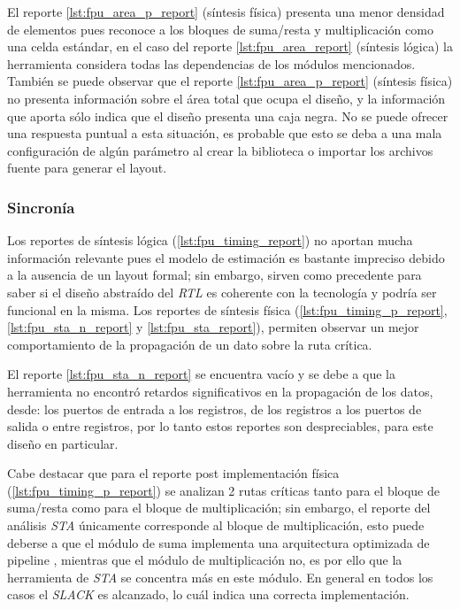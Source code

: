 El reporte \ref{lst:fpu_area_p_report} (síntesis física) presenta una menor densidad de elementos pues reconoce a los bloques de suma/resta y multiplicación como una celda estándar, en el caso del reporte \ref{lst:fpu_area_report} (síntesis lógica) la herramienta considera todas las dependencias de los módulos mencionados. También se puede observar que el reporte \ref{lst:fpu_area_p_report} (síntesis física) no presenta información sobre el área total que ocupa el diseño, y la información que aporta sólo indica que el diseño presenta una caja negra. No se puede ofrecer una respuesta puntual a esta situación, es probable que esto se deba a una mala configuración de algún parámetro al crear la biblioteca o importar los archivos fuente para generar el layout.

\subsubsection{Sincronía}

Los reportes de síntesis lógica (\ref{lst:fpu_timing_report}) no aportan mucha información relevante pues el modelo de estimación es bastante impreciso debido a la ausencia de un layout formal; sin embargo, sirven como precedente para saber si el diseño abstraído del \textit{RTL} es coherente con la tecnología y podría ser funcional en la misma. Los reportes de síntesis física (\ref{lst:fpu_timing_p_report}, \ref{lst:fpu_sta_n_report} y \ref{lst:fpu_sta_report}), permiten observar un mejor comportamiento de la propagación de un dato sobre la ruta crítica.

El reporte \ref{lst:fpu_sta_n_report} se encuentra vacío y se debe a que la herramienta no encontró retardos significativos en la propagación de los datos, desde: los puertos de entrada a los registros, de los registros a los puertos de salida o entre registros, por lo tanto estos reportes son despreciables, para este diseño en particular.

Cabe destacar que para el reporte post implementación física (\ref{lst:fpu_timing_p_report}) se analizan 2 rutas críticas tanto para el bloque de suma/resta como para el bloque de multiplicación; sin embargo, el reporte del análisis \textit{STA} únicamente corresponde al bloque de multiplicación, esto puede deberse a que el módulo de suma implementa una arquitectura optimizada de pipeline \cite{Francis2016}, mientras que el módulo de multiplicación no, es por ello que la herramienta de \textit{STA} se concentra más en este módulo. En general en todos los casos el \textit{SLACK} es alcanzado, lo cuál indica una correcta implementación.


